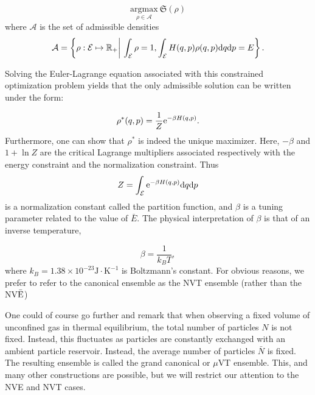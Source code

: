     $$ \underset{\rho \in \mathcal A}{\mathrm{argmax}}\ \mathfrak S(\rho)$$
    where $\mathcal A$ is the set of admissible densities
    $$\mathcal A=\left\{ \rho: \mathcal E \mapsto \mathbb{R}_+ \middle|\ \int_{\mathcal E} \rho =1, \int_{\mathcal E} H(q,p)\rho(q,p)\mathrm{d} q \mathrm{d} p=E \right\}.$$

    Solving the Euler-Lagrange equation associated with this constrained optimization problem yields that the only admissible solution can be written under the form:

    $$ \rho^*(q,p)= \frac 1{Z} \mathrm{e}^{-\beta H(q,p)}.$$
    Furthermore, one can show that $\rho^*$ is indeed the unique maximizer.
    Here, $-\beta$ and $1+\ln Z$ are the critical Lagrange multipliers associated respectively with the energy constraint and the normalization constraint. Thus
    $$Z=\int_{\mathcal E} \mathrm{e}^{-\beta H(q,p)}\mathrm{d} q \mathrm{d} p$$
    is a normalization constant called the partition function, and $\beta$ is a tuning parameter related to the value of $\bar E$. The physical interpretation of $\beta$ is that of an inverse temperature,

    $$ \beta = \frac 1{k_B T},$$
    where $k_B=1.38 \times 10 ^{-23} \mathrm{J\cdot K^{-1}}$ is Boltzmann's constant. For obvious reasons, we prefer to refer to the canonical ensemble as the NVT ensemble (rather than the NV$\bar {\text E}$)


One could of course go further and remark that when observing a fixed volume of unconfined gas in thermal equilibrium, the total number of particles $N$ is not fixed. Instead, this fluctuates as particles are constantly exchanged with an ambient particle reservoir. Instead, the average number of particles $\bar N$ is fixed. The resulting ensemble is called the grand canonical or $\mu$VT ensemble. This, and many other constructions are possible, but we will restrict our attention to the NVE and NVT cases. 

